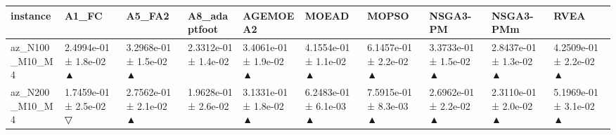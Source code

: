 \begin{tabular}{llllllllll}
\toprule
instance & A1\_FC & A5\_FA2 & A8\_adaptfoot & AGEMOEA2 & MOEAD & MOPSO & NSGA3-PM & NSGA3-PMm & RVEA \\
\midrule
az\_N100\_M10\_M4 & 2.4994e-01 ± 1.8e-02 ▲ & 3.2968e-01 ± 1.5e-02 ▲ & 2.3312e-01 ± 1.4e-02 & 3.4061e-01 ± 1.9e-02 ▲ & 4.1554e-01 ± 1.1e-02 ▲ & 6.1457e-01 ± 2.2e-02 ▲ & 3.3733e-01 ± 1.5e-02 ▲ & 2.8437e-01 ± 1.3e-02 ▲ & 4.2509e-01 ± 2.2e-02 ▲ \\
az\_N200\_M10\_M4 & 1.7459e-01 ± 2.5e-02 ▽ & 2.7562e-01 ± 2.1e-02 ▲ & 1.9628e-01 ± 2.6e-02 & 3.1331e-01 ± 1.8e-02 ▲ & 6.2483e-01 ± 6.1e-03 ▲ & 7.5915e-01 ± 8.3e-03 ▲ & 2.6962e-01 ± 2.2e-02 ▲ & 2.3110e-01 ± 2.0e-02 ▲ & 5.1969e-01 ± 3.1e-02 ▲ \\
\bottomrule
\end{tabular}
